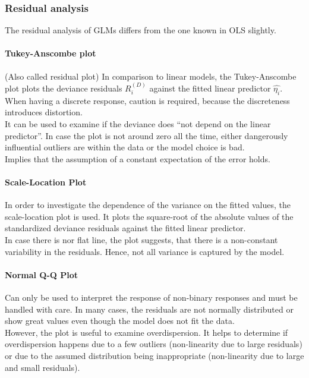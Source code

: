 \subsubsection{Residual analysis}
The residual analysis of GLMs differs from the one known in OLS slightly.

\paragraph{Tukey-Anscombe plot}
(Also called residual plot) In comparison to linear models, the Tukey-Anscombe plot plots the deviance residuals $R_i^{(D)}$ against the fitted linear predictor $\hat{\eta_i}$. When having a discrete response, caution is required, because the discreteness introduces distortion.\\
It can be used to examine if the deviance does ``not depend on the linear predictor''. In case the plot is not around zero all the time, either dangerously influential outliers are within the data or the model choice is bad.\\
Implies that the assumption of a constant expectation of the error holds.

\paragraph{Scale-Location Plot}
In order to investigate the dependence of the variance on the fitted values, the scale-location plot is used. It plots the square-root of the absolute values of the standardized deviance residuals against the fitted linear predictor.\\
In case there is nor flat line, the plot suggests, that there is a non-constant variability in the residuals. Hence, not all variance is captured by the model.

\paragraph{Normal Q-Q Plot}
Can only be used to interpret the response of non-binary responses and must be handled with care. In many cases, the residuals are not normally distributed or show great values even though the model does not fit the data.\\
However, the plot is useful to examine overdispersion. It helps to determine if overdispersion happens due to a few outliers (non-linearity due to large residuals) or due to the assumed distribution being inappropriate (non-linearity due to large and small residuals).


